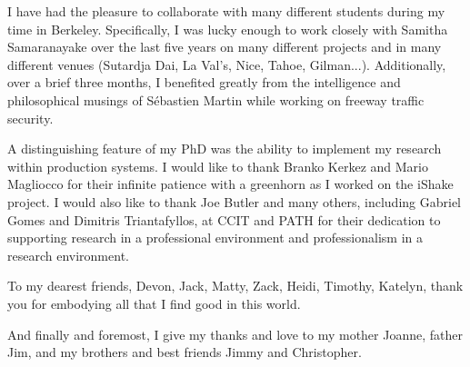 I have had the pleasure to collaborate with many different students during my time in Berkeley. Specifically, I was lucky enough to work closely with Samitha Samaranayake over the last five years on many different projects and in many different venues (Sutardja Dai, La Val's, Nice, Tahoe, Gilman...). Additionally, over a brief three months, I benefited greatly from the intelligence and philosophical musings of S\'{e}bastien Martin while working on freeway traffic security.

	A distinguishing feature of my PhD was the ability to implement my research within production systems. I would like to thank Branko Kerkez and Mario Magliocco for their infinite patience with a greenhorn as I worked on the iShake project. I would also like to thank Joe Butler and many others, including Gabriel Gomes and Dimitris Triantafyllos, at CCIT and PATH for their dedication to supporting research in a professional environment and professionalism in a research environment.

To my dearest friends, Devon, Jack, Matty, Zack, Heidi, Timothy, Katelyn, thank you for embodying all that I find good in this world.

And finally and foremost, I give my thanks and love to my mother Joanne, father Jim, and my brothers and best friends Jimmy and Christopher.